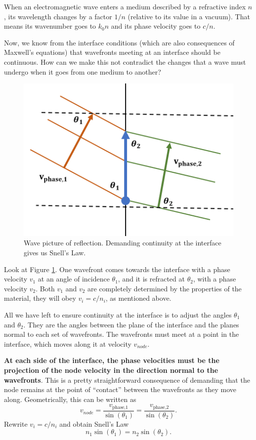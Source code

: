 When an electromagnetic wave enters a medium described by a refractive index $n$, its wavelength changes by a factor $1/n$ (relative to its value in a vacuum). That means its wavenumber goes to $k_0n$ and its phase velocity goes to $c/n$.

Now, we know from the interface conditions (which are also consequences of Maxwell's equations) that wavefronts meeting at an interface should be continuous. How can we make this not contradict the changes that a wave must undergo when it goes from one medium to another?

\begin{figure}[H]
    \centering
    \includegraphics[width=0.6\linewidth]{Figuras/total internal reflection wave picture.png}
    \caption{Wave picture of reflection. Demanding continuity at the interface gives us Snell's Law.}
    \label{fig:total.internal.reflection.wave.picture}
\end{figure}

Look at Figure \ref{fig:total.internal.reflection.wave.picture}. One wavefront comes towards the interface with a phase velocity $v_1$ at an angle of incidence $\theta_1$, and it is refracted at $\theta_2$, with a phase velocity $v_2$. Both $v_1$ and $v_2$ are completely determined by the properties of the material, they will obey $v_i=c/n_i$, as mentioned above.

All we have left to ensure continuity at the interface is to adjust the angles $\theta_1$ and $\theta_2$. They are the angles between the plane of the interface and the planes normal to each set of wavefronts. The wavefronts must meet at a point in the interface, which moves along it at velocity $v_{node}$.

\textbf{At each side of the interface, the phase velocities must be the projection of the node velocity in the direction normal to the wavefronts}. This is a pretty straightforward consequence of demanding that the node remains at the point of ``contact'' between the wavefronts as they move along. Geometrically, this can be written as
\begin{equation}
    v_{node}=\frac{v_{\text{phase,1}}}{\sin(\theta_1)}=\frac{v_{\text{phase,2}}}{\sin(\theta_2)}.
\end{equation}
Rewrite $v_i=c/n_i$ and obtain Snell's Law
\begin{equation}
    n_1\sin(\theta_1)=n_2\sin(\theta_2).
\end{equation}

